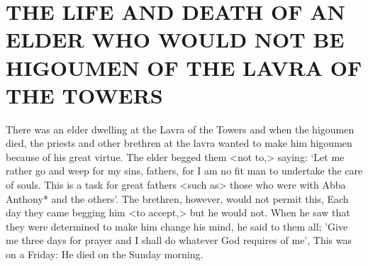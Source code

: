 \chapter{ THE LIFE AND DEATH OF AN ELDER WHO WOULD NOT BE HIGOUMEN OF THE LAVRA OF THE TOWERS}

There was an elder dwelling at the Lavra of the Towers and when the higoumen died, the priests and other brethren at the lavra wanted to make him higoumen because of his great virtue.
The elder begged them <not to,> saying: `Let me rather go and weep for my sins, fathers, for I am no fit man to undertake the care of souls.
This is a task for great fathers <such as> those who were with Abba Anthony* and the others'.
The brethren, however, would not permit this, Each day they came begging him <to accept,> but he would not.
When he saw that they were determined to make him change his mind, he said to them all; 'Give me three days for prayer and I shall do whatever God requires of me', This was on a Friday:
He died on the Sunday morning.

